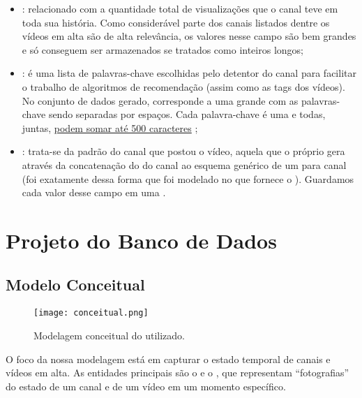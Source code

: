\begin{itemize}
    \item {}: relacionado com a quantidade total de visualizações que o canal teve em toda sua história. Como considerável parte dos canais listados dentre os vídeos em alta são de alta relevância, os valores nesse campo são bem grandes e só conseguem ser armazenados se tratados como inteiros longos;
    \item {}: é uma lista de palavras-chave escolhidas pelo detentor do canal para facilitar o trabalho de algoritmos de recomendação (assim como as tags dos vídeos). No conjunto de dados gerado, corresponde a uma grande  com as palavras-chave sendo separadas por espaços. Cada palavra-chave é uma  e todas, juntas, \href{https://developers.google.com/youtube/v3/docs/channels?hl=pt-br#brandingSettings.channel.keywords}{podem somar até 500 caracteres} \cite{google_youtube_channels};
    \item {}: trata-se da  padrão do canal que postou o vídeo, aquela que o próprio  gera através da concatenação do  do canal ao esquema genérico de um  para canal (foi exatamente dessa forma que foi modelado no  que fornece o ). Guardamos cada valor desse campo em uma .
  \end{itemize}


\chapter{Projeto do Banco de Dados}

\section{Modelo Conceitual}

  \vspace{2cm}
  \begin{figure}[H]
    \centering
    \texttt{[image: conceitual.png]}
    \caption{Modelagem conceitual do  utilizado.}
  \end{figure}

  O foco da nossa modelagem está em capturar o estado temporal de canais e vídeos em alta. As entidades principais são o  e o , que representam ``fotografias'' do estado de um canal e de um vídeo em um momento específico.

